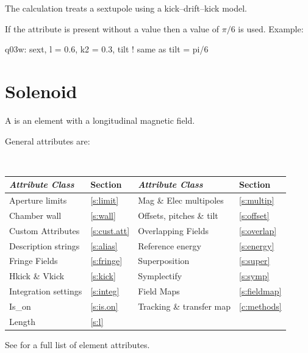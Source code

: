 {The 
calculation treats a sextupole using a kick--drift--kick model.

If the  attribute is present without a value then a value of 
$\pi/6$ is used.
Example:
\begin{example}
  q03w: sext, l = 0.6, k2 = 0.3, tilt  ! same as tilt = pi/6
\end{example}

\section{Solenoid}
\label{s:sol}

A  is an element with a longitudinal magnetic field.

General  attributes are:
\begin{center}
\tt
\begin{tabular}{llll} \toprule
  {\sl Attribute Class}      & Section           & {\sl Attribute Class}      & Section            \\ \midrule
  Aperture limits            & \ref{s:limit}     & Mag \& Elec multipoles     & \ref{s:multip}     \\
  Chamber wall               & \ref{s:wall}      & Offsets, pitches \& tilt   & \ref{s:offset}     \\
  Custom Attributes          & \ref{s:cust.att}  & Overlapping Fields         & \ref{s:overlap}    \\
  Description strings        & \ref{s:alias}     & Reference energy           & \ref{s:energy}     \\ 
  Fringe Fields              & \ref{s:fringe}    & Superposition              & \ref{s:super}      \\
  Hkick \& Vkick             & \ref{s:kick}      & Symplectify                & \ref{s:symp}       \\
  Integration settings       & \ref{s:integ}     & Field Maps                 & \ref{s:fieldmap}   \\
  Is_on                      & \ref{s:is.on}     & Tracking \& transfer map   & \ref{c:methods}    \\ 
  Length                     & \ref{s:l}         &                            &                    \\ 
  \bottomrule
\end{tabular}
\end{center}
\toffset
See  for a full list of element attributes.

}
